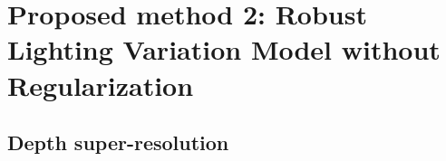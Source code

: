 \section{Proposed method 2: Robust Lighting Variation Model without Regularization}

\subsection{Depth super-resolution}



